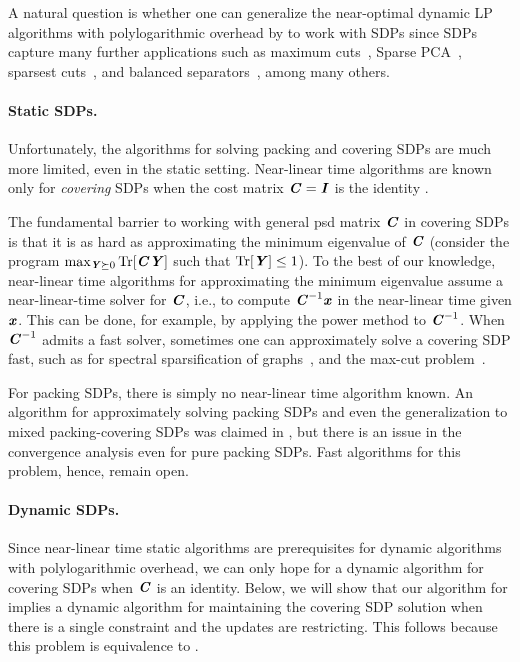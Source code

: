 A natural question is whether one can generalize the near-optimal dynamic LP algorithms with polylogarithmic overhead by \cite{bhattacharya2023dynamic} to work with SDPs since SDPs capture many further applications such as maximum cuts~\cite{iyengar2011approximating,klein1996efficient}, Sparse PCA~\cite{iyengar2011approximating}, sparsest cuts~\cite{iyengar2010feasible}, and  balanced separators~\cite{orecchia2012approximating}, among many others.

\paragraph{Static SDPs.}
Unfortunately, the algorithms for solving packing and covering SDPs are much more limited, even in the static setting. Near-linear time algorithms are known only for \emph{covering} SDPs when the cost matrix $\boldsymbol{\mathit{C}} = \boldsymbol{\mathit{I}}$ is the identity \cite{peng2012faster,allen2016using}. 

The fundamental barrier to working with general psd matrix $\boldsymbol{\mathit{C}}$ in covering SDPs is that it is as hard as approximating the minimum eigenvalue of $\boldsymbol{\mathit{C}}$ (consider the program $\max_{\boldsymbol{\mathit{Y}}\succeq 0} \operatorname{Tr}[\boldsymbol{\mathit{C}}\boldsymbol{\mathit{Y}}]$ such that $\operatorname{Tr}[\boldsymbol{\mathit{Y}}]\leq 1$). To the best of our knowledge, near-linear time algorithms for approximating the minimum eigenvalue assume a near-linear-time solver for $\boldsymbol{\mathit{C}}$, i.e., to compute $\boldsymbol{\mathit{C}}^{-1}\boldsymbol{\mathit{x}}$ in the near-linear time given $\boldsymbol{\mathit{x}}$. This can be done, for example, by applying the power method to $\boldsymbol{\mathit{C}}^{-1}$. When $\boldsymbol{\mathit{C}}^{-1}$ admits a fast solver, sometimes one can approximately solve a covering SDP fast, such as for spectral sparsification of graphs~\cite{lee2017sdp}, and the max-cut problem~\cite{arora2007combinatorial,trevisan2009max}.

For packing SDPs, there is simply no near-linear time algorithm known. An algorithm for approximately solving packing SDPs and even the generalization to mixed packing-covering SDPs was claimed in \cite{jambulapati2021positive}, but there is an issue in the convergence analysis even for pure packing SDPs. Fast algorithms for this problem, hence, remain open.

\paragraph{Dynamic SDPs.}
Since near-linear time static algorithms are prerequisites for dynamic algorithms with polylogarithmic overhead, we can only hope for a dynamic algorithm for covering SDPs when $\boldsymbol{\mathit{C}}$ is an identity. 
Below, we will show that our algorithm for  implies a dynamic algorithm for maintaining the covering SDP solution when there is a single constraint and the updates are restricting. This follows because this problem is equivalence to .



